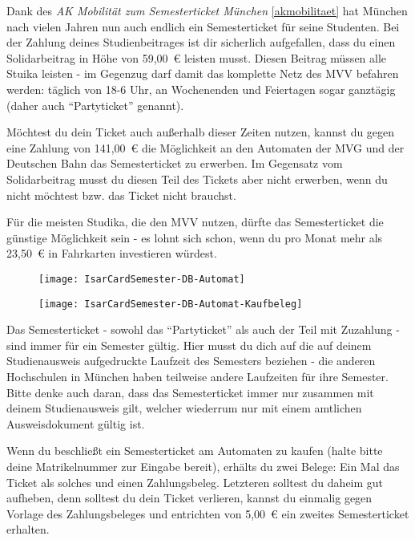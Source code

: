 Dank des \emph{AK Mobilität zum Semesterticket München} \ref{akmobilitaet} hat München nach vielen Jahren nun auch endlich ein Semesterticket für seine Studenten. Bei der Zahlung deines Studienbeitrages ist dir sicherlich aufgefallen, dass du einen Solidarbeitrag in Höhe von 59,00~€ leisten musst. Diesen Beitrag müssen alle Stuika leisten - im Gegenzug darf damit das komplette Netz des MVV befahren werden: täglich von 18-6 Uhr, an Wochenenden und Feiertagen sogar ganztägig (daher auch "`Partyticket"' genannt).


Möchtest du dein Ticket auch außerhalb dieser Zeiten nutzen, kannst du gegen eine Zahlung von 141,00~€ die Möglichkeit an den Automaten der MVG und der Deutschen Bahn das Semesterticket zu erwerben. Im Gegensatz vom Solidarbeitrag musst du diesen Teil des Tickets aber nicht erwerben, wenn du nicht möchtest bzw. das Ticket nicht brauchst.

Für die meisten Studika, die den MVV nutzen, dürfte das Semesterticket die günstige Möglichkeit sein - es lohnt sich schon, wenn du pro Monat mehr als 23,50~€ in Fahrkarten investieren würdest.

\begin{figure}[ht]
\centering
	\begin{minipage}[b]{0.45\linewidth}
		\texttt{[image: IsarCardSemester-DB-Automat]}
		\label{fig:isarcardsemesterdb}
	\end{minipage}
	\quad
	\begin{minipage}[b]{0.45\linewidth}
		\texttt{[image: IsarCardSemester-DB-Automat-Kaufbeleg]}
		\label{fig:isarcardsemesterbelegdb}
	\end{minipage}
\end{figure}

Das Semesterticket - sowohl das "`Partyticket"' als auch der Teil mit Zuzahlung - sind immer für ein Semester gültig. Hier musst du dich auf die auf deinem Studienausweis aufgedruckte Laufzeit des Semesters beziehen - die anderen Hochschulen in München haben teilweise andere Laufzeiten für ihre Semester. Bitte denke auch daran, dass das Semesterticket immer nur zusammen mit deinem Studienausweis gilt, welcher wiederrum nur mit einem amtlichen Ausweisdokument gültig ist.

Wenn du beschließt ein Semesterticket am Automaten zu kaufen (halte bitte deine Matrikelnummer zur Eingabe bereit), erhälts du zwei Belege: Ein Mal das Ticket als solches und einen Zahlungsbeleg. Letzteren solltest du daheim gut aufheben, denn solltest du dein Ticket verlieren, kannst du einmalig gegen Vorlage des Zahlungsbeleges und entrichten von 5,00~€ ein zweites Semesterticket erhalten.

